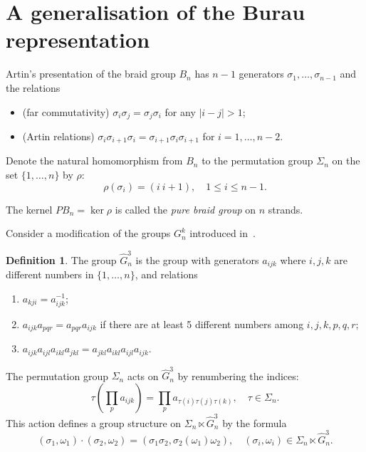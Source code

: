 \documentclass{article}
\theoremstyle{definition}
\newtheorem{definition}{Definition}
\begin{document}
\section{A generalisation of the Burau representation}

Artin's presentation of the braid group $B_n$ has $n-1$ generators $\sigma_1,\dots,\sigma_{n-1}$ and the relations
\begin{itemize}
    \item (far commutativity) $\sigma_i\sigma_j=\sigma_j\sigma_i$ for any $|i-j|>1$;
    \item (Artin relations) $\sigma_i\sigma_{i+1}\sigma_i=\sigma_{i+1}\sigma_i\sigma_{i+1}$ for $i=1,\dots,n-2$.
\end{itemize}

Denote the natural homomorphism from $B_n$ to the permutation group $\Sigma_{n}$ on the set $\{1,\dots,n\}$ by $\rho$:
\begin{equation}\label{eq:map_from_braids_to_permutations}
\rho(\sigma_i)=(i\ i+1),\quad 1\le i\le n-1.
\end{equation}

The kernel $PB_n=\ker\rho$ is called the \emph{pure braid group} on $n$ strands.

Consider a modification of the groups $G^k_n$ introduced in~\cite[Section 2.3]{FKM}.

\begin{definition}
    The group $\hat G^3_n$ is the group with generators $a_{ijk}$ where $i,j,k$ are different numbers in $\{1,\dots,n\}$, and relations
\begin{enumerate}
    \item $a_{kji}=a_{ijk}^{-1}$;
    \item $a_{ijk}a_{pqr}=a_{pqr}a_{ijk}$ if there are at least 5 different numbers among $i,j,k,p,q,r$;
    \item $a_{ijk}a_{ijl}a_{ikl}a_{jkl}=a_{jkl}a_{ikl}a_{ijl}a_{ijk}$.
\end{enumerate}
\end{definition}

The permutation group $\Sigma_n$ acts on $\hat G^3_n$ by renumbering the indices:
\begin{equation}\label{eq:permutation_action_Gkn}
\tau \left(\prod_p a_{ijk}\right)=\prod_p a_{\tau(i)\tau(j)\tau(k)},\quad \tau\in \Sigma_n.
\end{equation}
This action defines a group structure on $\Sigma_n\ltimes \hat G^3_n$ by the formula
\begin{equation}\label{eq:product_Gkn_permutation}
(\sigma_1, \omega_1)\cdot(\sigma_2,\omega_2)=(\sigma_1\sigma_2, \sigma_2(\omega_1)\omega_2),\quad (\sigma_i,\omega_i)\in \Sigma_n\ltimes \hat G^3_n.
\end{equation}
\end{document}
